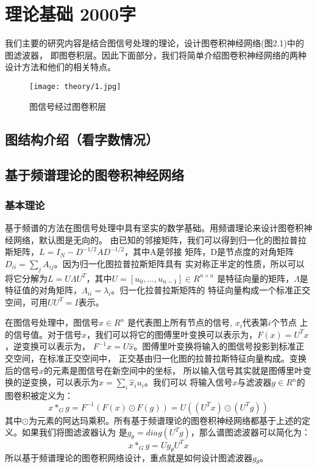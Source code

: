 \cleardoublepage

\section{理论基础 2000字}
我们主要的研究内容是结合图信号处理的理论，设计图卷积神经网络(图2.1)中的图滤波器，
即图卷积层。因此下面部分，我们将简单介绍图卷积神经网络的两种设计方法和他们的相关特点。

\begin{figure}[ht]
    \centering
    \texttt{[image: theory/1.jpg]}
    \caption{\label{2-1}图信号经过图卷积层}
\end{figure}

\subsection{图结构介绍（看字数情况）}

\subsection{基于频谱理论的图卷积神经网络}

\subsubsection{基本理论}
基于频谱的方法在图信号处理中具有坚实的数学基础。用频谱理论来设计图卷积神经网络，默认图是无向的。
由已知的邻接矩阵，我们可以得到归一化的图拉普拉斯矩阵，$ L=I_N-D^{-1/2}AD^{-1/2} $，其中A是邻接
矩阵，D是节点度的对角矩阵 $ D_{ii}={\sum_{j}} A_{ij} $。因为归一化图拉普拉斯矩阵具有
实对称正半定的性质，所以可以将它分解为$ L=U\Lambda U^T $，其中$ U=[u_0,\ldots,u_{n-1}]∈R^{n×n} $
是特征向量的矩阵，$ \Lambda $是特征值的对角矩阵，$\Lambda_{ii}=\lambda_{i} $。归一化拉普拉斯矩阵的
特征向量构成一个标准正交空间，可用$ UU^{T}=I $表示。

在图信号处理中，图信号$ x\in R^n $ 是代表图上所有节点的信号, $ x_i $代表第$ i $个节点
上的信号值。对于信号$ x $，我们可以将它的图傅里叶变换可以表示为，$ F(x)=U^{T}x $，逆变换可以表示为，
$ F^{-1} \widehat{x} = U\widehat{x} $。图傅里叶变换将输入的图信号投影到标准正交空间，在标准正交空间中，
正交基由归一化图的拉普拉斯特征向量构成。变换后的信号$ \widehat{x} $的元素是图信号在新空间中的坐标，
所以输入信号其实就是图傅里叶变换的逆变换，可以表示为$ x = {\sum_{i}}\widehat{x}_{i}u_{i} $。我们可以
将输入信号$ x $与滤波器$ g \in R^{n} $的图卷积被定义为：
$$ x\ast_{G}g = F^{-1}(F(x) \odot F(g)) = U((U^{T}x) \odot (U^{T}g)) $$
其中$ \odot $为元素的阿达玛乘积。所有基于频谱理论的图卷积神经网络都基于上述的定义。如果我们将图滤波器认为
是$ g_{\theta}=diag(U^{T}g) $，那么谱图滤波器可以简化为：
$$ x\ast_{G}g = U g_{\theta} U^{T} x $$
所以基于频谱理论的图卷积网络设计，重点就是如何设计图滤波器$ g_{\theta} $。

